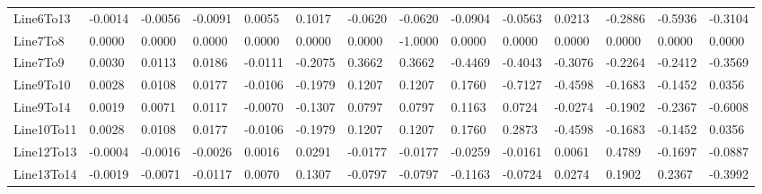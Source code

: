 \documentclass[12pt,x11names]{article}
\theoremstyle{definition}
\begin{document}
\begin{appendix}
\begin{landscape}
\begin{table}[h]
\begin{minipage}[t]{.525\linewidth}
{\begin{tabular}{|l|lllllllllllll|}
Line6To13  		&	-0.0014	&	-0.0056	&	-0.0091	&	0.0055	&	0.1017	&	-0.0620	&	-0.0620	&	-0.0904	&	-0.0563	&	0.0213	&	-0.2886	&	-0.5936	&	-0.3104	\\
Line7To8   		&	0.0000	&	0.0000	&	0.0000	&	0.0000	&	0.0000	&	0.0000	&	-1.0000	&	0.0000	&	0.0000	&	0.0000	&	0.0000	&	0.0000	&	0.0000	\\
Line7To9   		&	0.0030	&	0.0113	&	0.0186	&	-0.0111	&	-0.2075	&	0.3662	&	0.3662	&	-0.4469	&	-0.4043	&	-0.3076	&	-0.2264	&	-0.2412	&	-0.3569	\\
Line9To10  		&	0.0028	&	0.0108	&	0.0177	&	-0.0106	&	-0.1979	&	0.1207	&	0.1207	&	0.1760	&	-0.7127	&	-0.4598	&	-0.1683	&	-0.1452	&	0.0356	\\
Line9To14  		&	0.0019	&	0.0071	&	0.0117	&	-0.0070	&	-0.1307	&	0.0797	&	0.0797	&	0.1163	&	0.0724	&	-0.0274	&	-0.1902	&	-0.2367	&	-0.6008	\\
Line10To11 		&	0.0028	&	0.0108	&	0.0177	&	-0.0106	&	-0.1979	&	0.1207	&	0.1207	&	0.1760	&	0.2873	&	-0.4598	&	-0.1683	&	-0.1452	&	0.0356	\\
Line12To13 		&	-0.0004	&	-0.0016	&	-0.0026	&	0.0016	&	0.0291	&	-0.0177	&	-0.0177	&	-0.0259	&	-0.0161	&	0.0061	&	0.4789	&	-0.1697	&	-0.0887	\\
Line13To14 		&	-0.0019	&	-0.0071	&	-0.0117	&	0.0070	&	0.1307	&	-0.0797	&	-0.0797	&	-0.1163	&	-0.0724	&	0.0274	&	0.1902	&	0.2367	&	-0.3992	\\
     \hline
\end{tabular}}
\hfill
\end{minipage}
\end{table}
\end{landscape}
\end{appendix}


 

\end{document}

